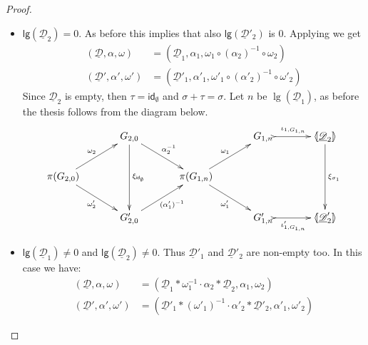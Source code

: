 \documentclass[a4paper]{article}
\newcommand{\id}[1]{\mathsf{id}_{#1}}
\newcommand{\dder}[1]{\mathscr{#1}}
\newcommand{\der}[1]{\underline{\dder{#1}}}
\newcommand{\lpro}{\langle \hspace{-1.85pt}[}
\newcommand{\rpro}{]\hspace{-1.85pt}\rangle}
\newcommand{\lgh}[0]{\mathsf{lg}}
\theoremstyle{definition}
\begin{document}
\begin{proof}
\begin{itemize}
		\item $\lgh(\der{D}_2)=0$.  As before this implies that also $\lgh(\der{D}'_2)$ is $0$.  Applying  we get 
		\begin{align*}
			(\der{D}, \alpha, \omega)&=(\der{D}_1, \alpha_1, \omega_1 \circ (\alpha_2)^{-1}\circ \omega_2) \\ (\der{D}', \alpha', \omega')&=(\der{D}'_1, \alpha'_1, \omega'_1 \circ (\alpha'_2)^{-1}\circ \omega'_2)
		\end{align*}
		Since $\der{D}_2$ is empty, then $\tau=\id{\emptyset}$ and $\sigma+\tau=\sigma$. Let $n$ be $\lg(\der{D}_1)$, as before the thesis follows from the diagram below.
		\[\xymatrix@C=35pt{& G_{2,0}\ar[dd]^{\xi_{\id{\emptyset}}} \ar[dr]^{\alpha^{-1}_2}&&G_{1,n}\ar@{>->}[r]^-{\iota_{1, G_{1,n}}} & \lpro \der{D}_2\rpro \ar[dd]^{\xi_{\sigma_1}}\\\pi(G_{2,0})  \ar[ur]^{\omega_2} \ar[dr]_{\omega'_2}&& \pi(G_{1,n}) \ar[ur]^{\omega_1} \ar[dr]_{\omega'_1}\\& G'_{2,0} \ar[ur]_{(\alpha'_1)^{-1}}&&G'_{1,n} \ar@{>->}[r]_-{\iota'_{1, G_{1,n}}}& \lpro \der{D}'_2\rpro}\]
		\item   $\lgh(\der{D}_1)\neq0$ and $\lgh(\der{D}_2)\neq 0$. Thus $\der{D}'_1$ and $\der{D}'_2$ are non-empty too. In this case we have:
		\begin{align*}
			(\der{D}, \alpha, \omega)&=(\der{D}_1*\omega_1^{-1}\cdot \alpha_2*\der{D}_2, \alpha_1, \omega_2)\\
			(\der{D}', \alpha', \omega')&=(\der{D}'_1*(\omega'_1)^{-1}\cdot \alpha'_2*\der{D}'_2, \alpha'_1, \omega'_2)
		\end{align*}
		

\end{itemize}
\end{proof}
\end{document}
